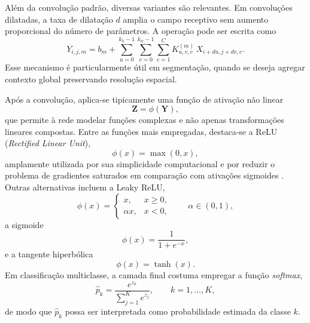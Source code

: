 \documentclass[tcc,capa]{texufpel}
\begin{document}
Além da convolução padrão, diversas variantes são relevantes. Em convoluções dilatadas, a taxa de dilatação $d$ amplia o campo receptivo sem aumento proporcional do número de parâmetros. A operação pode ser escrita como
\begin{equation}
Y_{i,j,m}
=
b_m + \sum_{u=0}^{k_h-1}\sum_{v=0}^{k_w-1}\sum_{c=1}^{C}
K^{(m)}_{u,v,c}\,X_{i+du,j+dv,c}.
\end{equation}
Esse mecanismo é particularmente útil em segmentação, quando se deseja agregar contexto global preservando resolução espacial.

Após a convolução, aplica-se tipicamente uma função de ativação não linear
\begin{equation}
\mathbf{Z} = \phi(\mathbf{Y}),
\end{equation}
que permite à rede modelar funções complexas e não apenas transformações lineares compostas. Entre as funções mais empregadas, destaca-se a ReLU (\textit{Rectified Linear Unit}),
\begin{equation}
\phi(x) = \max(0,x),
\end{equation}
amplamente utilizada por sua simplicidade computacional e por reduzir o problema de gradientes saturados em comparação com ativações sigmoides \cite{Nair2010}. Outras alternativas incluem a Leaky ReLU,
\begin{equation}
\phi(x) =
\begin{cases}
x, & x \geq 0,\\
\alpha x, & x < 0,
\end{cases}
\qquad \alpha \in (0,1),
\end{equation}
a sigmoide
\begin{equation}
\phi(x)=\frac{1}{1+e^{-x}},
\end{equation}
e a tangente hiperbólica
\begin{equation}
\phi(x)=\tanh(x).
\end{equation}
Em classificação multiclasse, a camada final costuma empregar a função \textit{softmax},
\begin{equation}
\hat{p}_k = \frac{e^{z_k}}{\sum_{j=1}^{K} e^{z_j}},
\qquad k=1,\dots,K,
\end{equation}
de modo que $\hat{p}_k$ possa ser interpretada como probabilidade estimada da classe $k$.
\end{document}
